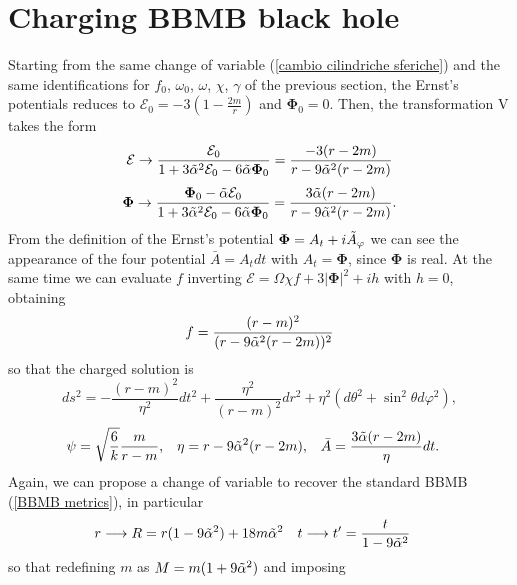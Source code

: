 \section{Charging BBMB black hole} \label{sezione bbmb + harrison}
Starting from the same change of variable (\ref{cambio cilindriche sferiche}) and the same identifications for $f_0$, $\omega_0$, $\omega$, $\chi$, $\gamma$ of the previous section, the Ernst's potentials reduces to $\mathcal{E}_0 = -3\left(1-\frac{2m}{r}\right)$ and $\boldsymbol{\Phi}_0=0$.
Then, the transformation V takes the form 
\begin{equation}
     \mathcal{E} \rightarrow \frac{\mathcal{E}_0}{1+3\Tilde{\alpha}^2\mathcal{E}_0-6\Tilde{\alpha}\boldsymbol{\Phi}_0} = \frac{-3(r-2m)}{r-9\Tilde{\alpha}^2(r-2m)} \notag
\end{equation}
\begin{equation}
    \boldsymbol{\Phi} \rightarrow \frac{\boldsymbol{\Phi}_0-\Tilde{\alpha}\mathcal{E}_0}{1+3\Tilde{\alpha}^2\mathcal{E}_0-6\Tilde{\alpha}\boldsymbol{\Phi}_0} = \frac{3\Tilde{\alpha}(r-2m)}{r-9\Tilde{\alpha}^2(r-2m)}. \notag
\end{equation}
From the definition of the Ernst's potential $\boldsymbol{\Phi} = A_t + i \Tilde{A}_{\varphi}$ we can see the appearance of the four potential $\bar{A} = A_t dt$ with $A_t = \boldsymbol{\Phi}$, since $\boldsymbol{\Phi}$ is real. At the same time we can evaluate $f$ inverting $\mathcal{E} = \Omega\chi f + 3 |\boldsymbol{\Phi}|^2 + i h$ with $h=0$, obtaining 
\begin{equation}
    f = \frac{(r-m)^2}{(r-9\Tilde{\alpha}^2(r-2m))^2}
\end{equation}
so that the charged solution is 
\begin{equation}
    ds^2=-\frac{(r-m)^2}{\eta^2}dt^2 + \frac{\eta^2}{(r-m)^2} dr^2 + \eta^2(d\theta^2 + \sin^2\theta d\varphi^2),
    \label{bbmb+ trasf. VI) sporca}
\end{equation}
\begin{align}
      \psi &=\sqrt{\frac{6}{k}}\frac{m}{r-m}, & \eta &= r-9\Tilde{\alpha}^2(r-2m), & \bar{A} &= \frac{3\Tilde{\alpha}(r-2m)}{\eta}dt. \notag
\end{align}
Again, we can propose a change of variable to recover the standard BBMB (\ref{BBMB metrics}), in particular 
\begin{align}
  r &\longrightarrow R = r(1-9\Tilde{\alpha}^2) + 18m\Tilde{\alpha}^2 & t &\longrightarrow t' = \frac{t}{1-9\Tilde{\alpha}^2}
\end{align}
so that redefining $m$ as $M = m (1+9\Tilde{\alpha}^2)$ and imposing 
